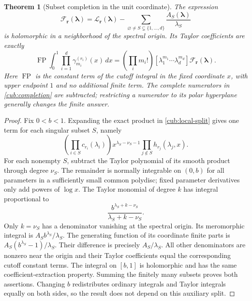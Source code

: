 \documentclass[11pt,a4paper]{article}
\newtheorem{theorem}{Theorem}[section]
\theoremstyle{definition}
\theoremstyle{remark}
\DeclareMathOperator*{\FP}{FP}
\numberwithin{equation}{section}
\begin{document}
\begin{theorem}[Subset completion in the unit coordinate]
\label{cub:general-completion}
The expression
\begin{equation}\label{cub:completion}
 \mathcal F_{\boldsymbol r}(\boldsymbol\lambda)
 =\mathcal L_{\boldsymbol r}(\boldsymbol\lambda)
   -\sum_{\varnothing\ne S\subsetneq\{1,\ldots,d\}}
            \frac{A_S(\boldsymbol\lambda)}{\lambda_S}
\end{equation}
is holomorphic in a neighborhood of the spectral origin.  Its Taylor
coefficients are exactly
\begin{equation}\label{cub:all-moments}
 \FP\int_0^1\prod_{i=1}^d\gamma_{m_i}^{(r_i)}(x)\,dx
 =\left(\prod_i m_i!\right)
 [\lambda_1^{m_1}\cdots\lambda_d^{m_d}]
          \mathcal F_{\boldsymbol r}(\boldsymbol\lambda).
\end{equation}
Here $\FP$ is the constant term of the cutoff integral in the fixed
coordinate $x$, with upper endpoint $1$ and no additional finite term.
The complete numerators in \eqref{cub:completion} are subtracted;
restricting a numerator to its polar hyperplane generally changes the
finite answer.
\end{theorem}

\begin{proof}
Fix $0<b<1$.  Expanding the exact product in
\eqref{cub:local-split} gives one term for each singular subset $S$,
namely
\[
 \left(\prod_{i\in S}c_{r_i}(\lambda_i)\right)
 x^{\lambda_S-\nu_S-1}
 \prod_{j\notin S}h_{r_j}(\lambda_j,x).
\]
For each nonempty $S$, subtract the Taylor polynomial of its smooth
product through degree $\nu_S$.  The remainder is normally integrable
on $(0,b)$ for all parameters in a sufficiently small common polydisc;
fixed parameter derivatives only add powers of $\log x$.
The Taylor monomial of degree $k$ has integral proportional to
\[
 \frac{b^{\lambda_S+k-\nu_S}}{\lambda_S+k-\nu_S}.
\]
Only $k=\nu_S$ has a denominator vanishing at the spectral origin.
Its meromorphic integral is $A_S b^{\lambda_S}/\lambda_S$.
The generating function of its coordinate finite parts is
$A_S(b^{\lambda_S}-1)/\lambda_S$.  Their difference is precisely
$A_S/\lambda_S$.  All other denominators are nonzero near the origin
and their Taylor coefficients equal the corresponding cutoff constant
terms.  The integral on $[b,1]$ is holomorphic and has the same
coefficient-extraction property.  Summing the finitely many subsets
proves both assertions.  Changing $b$ redistributes ordinary integrals
and Taylor integrals equally on both sides, so the result does not
depend on this auxiliary split.
\end{proof}
\end{document}
